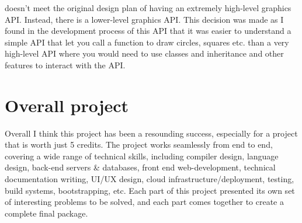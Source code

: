 \trys{} doesn't meet the original design plan of having an extremely high-level graphics API. Instead, there is a lower-level graphics API. This decision was made as I found in the development process of this API that it was easier to understand a simple API that let you call a function to draw circles, squares etc. than a very high-level API where you would need to use classes and inheritance and other features to interact with the API.

\section{Overall project}

Overall I think this project has been a resounding success, especially for a project that is worth just 5 credits. The project works seamlessly from end to end, covering a wide range of technical skills, including compiler design, language design, back-end servers \& databases, front end web-development, technical documentation writing, UI/UX design, cloud infrastructure/deployment, testing, build systems, bootstrapping, etc. Each part of this project presented its own set of interesting problems to be solved, and each part comes together to create a complete final package.
